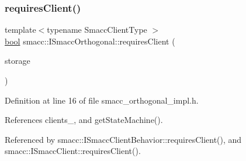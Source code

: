 \subsubsection{\texorpdfstring{requires\+Client()}{requiresClient()}}
{\footnotesize\ttfamily template$<$typename Smacc\+Client\+Type $>$ \\
\hyperlink{classbool}{bool} smacc\+::\+I\+Smacc\+Orthogonal\+::requires\+Client (\begin{DoxyParamCaption}\item[{Smacc\+Client\+Type $\ast$\&}]{storage }\end{DoxyParamCaption})}



Definition at line 16 of file smacc\+\_\+orthogonal\+\_\+impl.\+h.



References clients\+\_\+, and get\+State\+Machine().



Referenced by smacc\+::\+I\+Smacc\+Client\+Behavior\+::requires\+Client(), and smacc\+::\+I\+Smacc\+Client\+::requires\+Client().


